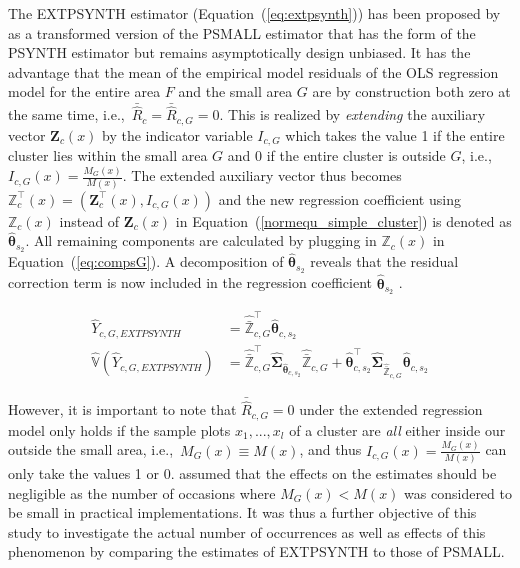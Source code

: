 \documentclass[remotesensing,article,accept,moreauthors,pdftex,10pt,a4paper]{Definitions/mdpi}
\newcommand{\psynth}{PSYNTH}
\newcommand{\psmall}{PSMALL}
\newcommand{\extpsynth}{EXTPSYNTH}
\newcommand{\var}{\mathbb{V}}
\begin{document}
The \extpsynth{} estimator (Equation~(\ref{eq:extpsynth})) has been proposed by \citet{mandallaz2013a} as a transformed version of the \psmall{} estimator that has the form of the \psynth{} estimator but remains asymptotically design unbiased. It has the advantage that the mean of the empirical model residuals of the OLS regression model for the entire area $F$ and the small area $G$ are by construction both zero at the same time, i.e.,~$\bar{\hat{R}}_{c}  =  \bar{\hat{R}}_{c,G}  =  0$. This is realized by \textit{extending} the auxiliary vector $\pmb{Z}_{c}(x)$ by the indicator variable $I_{c,G}$ which takes the value 1 if the entire cluster lies within the small area $G$ and 0 if the entire cluster is outside $G$, i.e.,~$I_{c,G}(x) = \frac{M_{G}(x)}{M(x)}$. The extended auxiliary vector thus becomes $\pmb{\mathbb{Z}}_{c}^{\top}(x) =  (\pmb{Z}_{c}^{\top}(x),I_{c,G}(x))$ and the new regression coefficient using $\pmb{\mathbb{Z}}_{c}(x)$ instead of $\pmb{Z}_{c}(x)$ in Equation~(\ref{normequ_simple_cluster}) is denoted as $\hat{\pmb{\theta}}_{s_2}$. All remaining components are calculated by plugging in $\pmb{\mathbb{Z}}_{c}(x)$ in Equation~(\ref{eq:compsG}). A decomposition of $\hat{\pmb{\theta}}_{s_2}$ reveals that the residual correction term is now included in the regression coefficient $\hat{\pmb{\theta}}_{s_2}$ \citep{mandallaz2016}.

\begin{subequations}\label{eq:extpsynth}
	\begin{align}
	\hat{Y}_{c,G,EXTPSYNTH} &  = \hat{\bar{\pmb{\mathbb{Z}}}}_{c,G}^{\top}\hat{\pmb{\theta}}_{c,s_2} \label{eq:extpsynth_pest} \\
	\hat{\var}(\hat{Y}_{c,G,EXTPSYNTH})&  = 
	\hat{\bar{\pmb{\mathbb{Z}}}}_{c,G}^{\top}\hat{\pmb{\Sigma}}_{\hat{\pmb{\theta}}_{c,s_2}}
	\hat{\bar{\pmb{\mathbb{Z}}}}_{c,G}
	+ \hat{\pmb{\theta}}^{\top}_{c,s_2}\hat{\pmb{\Sigma}}_{\hat{\bar{\pmb{\mathbb{Z}}}}_{c,G}}\hat{\pmb{\theta}}_{c,s_2} \label{eq:extpsynth_var}
	\end{align}
\end{subequations}

However, it is important to note that $\bar{\hat{R}}_{c,G}  =  0$ under the extended regression model only holds if the sample plots $x_1, ..., x_l$ of a cluster are \textit{all} either inside our outside the small area, i.e.,~$M_G(x)\equiv M(x)$, and thus $I_{c,G}(x) = \frac{M_{G}(x)}{M(x)}$ can only take the values 1 or 0. \citet{mandallaz2016} assumed that the effects on the estimates should be negligible as the number of occasions where $M_{G}(x) < M(x)$ was considered to be small in practical implementations. It was thus a further objective of this study to investigate the actual number of occurrences as well as effects of this phenomenon by comparing the estimates of \extpsynth{} to those of \psmall{}. %
\end{document}
